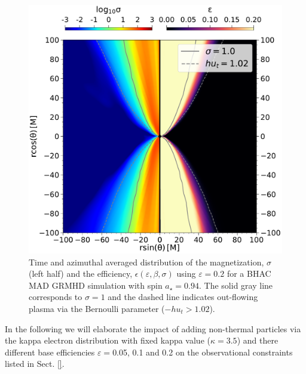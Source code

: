 \begin{figure}
  \centering
    \includegraphics[width=\columnwidth]{./figures/GRMHDphiavera0.94sigmaeta.pdf}
  \caption{Time and azimuthal averaged distribution of the magnetization, $\sigma$ (left half) and the efficiency, $\epsilon(\varepsilon,\beta,\sigma)$ using $\varepsilon=0.2 $ for a BHAC MAD GRMHD simulation with spin $a_{\star}=0.94$. The solid gray line corresponds to $\sigma=1$ and the dashed line indicates out-flowing plasma via the Bernoulli parameter ($-h u_{t}>1.02$).}
  \label{fig:varepsilon}
\end{figure}

In the following we will elaborate the impact of adding non-thermal particles via the kappa electron distribution with fixed kappa value ($\kappa=3.5$) and there different base efficiencies $\varepsilon=$0.05, 0.1 and 0.2 on the observational constraints listed in Sect. \ref{}.


